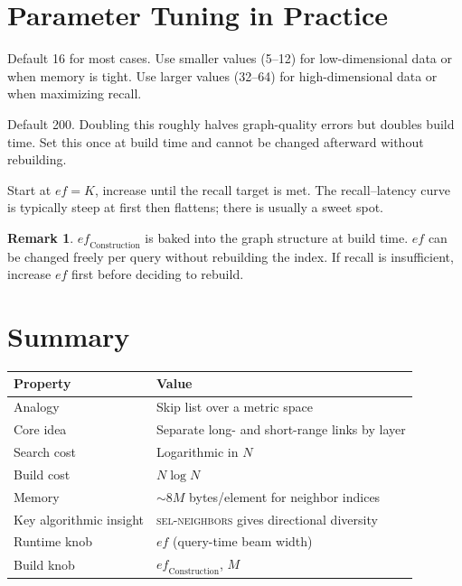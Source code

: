 \documentclass[11pt]{article}
\newcommand{\ef}{\mathit{ef}}
\theoremstyle{definition}
\newtheorem{remark}{Remark}
\begin{document}
\section{Parameter Tuning in Practice}

\begin{description}[leftmargin=2em]
  \item[$M$] Default 16 for most cases. Use smaller values (5--12) for low-dimensional data or when memory is tight. Use larger values (32--64) for high-dimensional data or when maximizing recall.
  \item[$\ef_{\mathrm{Construction}}$] Default 200. Doubling this roughly halves graph-quality errors but doubles build time. Set this once at build time and cannot be changed afterward without rebuilding.
  \item[$\ef$ (query time)] Start at $\ef = K$, increase until the recall target is met. The recall--latency curve is typically steep at first then flattens; there is usually a sweet spot.
\end{description}

\begin{remark}
  $\ef_{\mathrm{Construction}}$ is baked into the graph structure at build time. $\ef$ can be changed freely per query without rebuilding the index. If recall is insufficient, increase $\ef$ first before deciding to rebuild.
\end{remark}

\section{Summary}

\begin{center}
\begin{tabular}{ll}
\toprule
Property & Value \\
\midrule
Analogy & Skip list over a metric space \\
Core idea & Separate long- and short-range links by layer \\
Search cost & Logarithmic in $N$ \\
Build cost & $N \log N$ \\
Memory & $\sim 8M$ bytes/element for neighbor indices \\
Key algorithmic insight & \textsc{sel-neighbors} gives directional diversity \\
Runtime knob & $\ef$ (query-time beam width) \\
Build knob & $\ef_{\mathrm{Construction}}$, $M$ \\
\bottomrule
\end{tabular}
\end{center}
\end{document}
